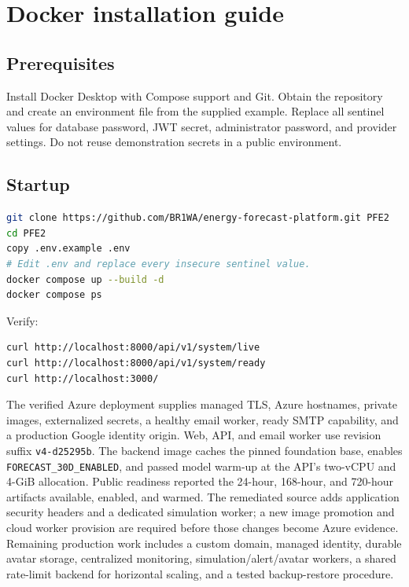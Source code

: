 \section{Docker installation guide}

\subsection{Prerequisites}

Install Docker Desktop with Compose support and Git. Obtain the repository and create an environment file from the supplied example. Replace all sentinel values for database password, JWT secret, administrator password, and provider settings. Do not reuse demonstration secrets in a public environment.

\subsection{Startup}

\begin{lstlisting}[language=bash]
git clone https://github.com/BR1WA/energy-forecast-platform.git PFE2
cd PFE2
copy .env.example .env
# Edit .env and replace every insecure sentinel value.
docker compose up --build -d
docker compose ps
\end{lstlisting}

Verify:
\begin{lstlisting}[language=bash]
curl http://localhost:8000/api/v1/system/live
curl http://localhost:8000/api/v1/system/ready
curl http://localhost:3000/
\end{lstlisting}

The verified Azure deployment supplies managed TLS, Azure hostnames, private images, externalized secrets, a healthy email worker, ready SMTP capability, and a production Google identity origin. Web, API, and email worker use revision suffix \texttt{v4-d25295b}. The backend image caches the pinned foundation base, enables \texttt{FORECAST\_30D\_ENABLED}, and passed model warm-up at the API's two-vCPU and 4-GiB allocation. Public readiness reported the 24-hour, 168-hour, and 720-hour artifacts available, enabled, and warmed. The remediated source adds application security headers and a dedicated simulation worker; a new image promotion and cloud worker provision are required before those changes become Azure evidence. Remaining production work includes a custom domain, managed identity, durable avatar storage, centralized monitoring, simulation/alert/avatar workers, a shared rate-limit backend for horizontal scaling, and a tested backup-restore procedure.

